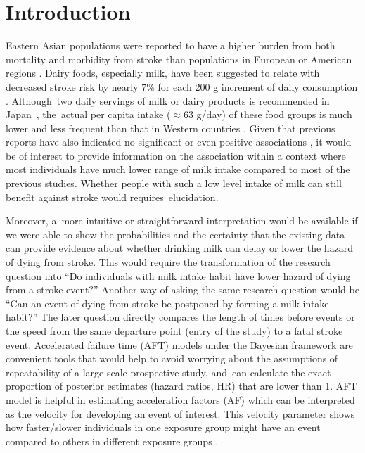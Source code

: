 \documentclass[nutrients,article,accept,moreauthors,pdftex]{Definitions/mdpi}
\begin{document}

\hypertarget{introduction}{%
\section{Introduction}\label{introduction}}

Eastern Asian populations were reported to have a higher burden from both
mortality and morbidity from stroke than populations in European or
American regions \citep{Kim2014}. Dairy foods, especially milk, have been
suggested to relate with decreased stroke risk by nearly 7\% for each
200 g increment of daily consumption \citep{DeGoede2016}. Although~two
daily servings of milk or dairy products is recommended in \mbox{Japan
\citep{Yoshiike2007}}, the~actual per capita intake (\(\approx\)63
g/day) of these food groups is much lower and less frequent than that in
Western countries \citep{Saito2019}. Given that previous reports have
also indicated no significant
\citep{Iso1999, sauvaget2003intake, Elwood2004} or even positive
associations \citep{Larsson2009}, it would be of interest to provide
information on the association within a context where most individuals
have much lower range of milk intake compared to most of the previous
studies. Whether people with such a low level intake of milk can still
benefit against stroke would requires~elucidation.

Moreover, a~more intuitive or straightforward interpretation would be
available if we were able to show the probabilities and the certainty
that the existing data can provide evidence about whether drinking milk
can delay or lower the hazard of dying from stroke. This would require
the transformation of the research question into ``Do individuals with milk
intake habit have lower hazard of dying from a stroke event?'' Another
way of asking the same research question would be ``Can an event of dying
from stroke be postponed by forming a milk intake habit?'' The later
question directly compares the length of times before events or the
speed from the same departure point (entry of the study) to a fatal
stroke event. Accelerated failure time (AFT) models under the Bayesian
framework are convenient tools that would help to avoid worrying about the
assumptions of repeatability of a large scale prospective study, and~can
calculate the exact proportion of posterior estimates (hazard ratios,
HR) that are lower than 1. AFT model is helpful in estimating
acceleration factors (AF) which can be interpreted as the velocity for
developing an event of interest. This velocity parameter shows how
faster/slower individuals in one exposure group might have an event
compared to others in different exposure groups
\citep{Wei1992, ibrahim2014b}.
\end{document}

